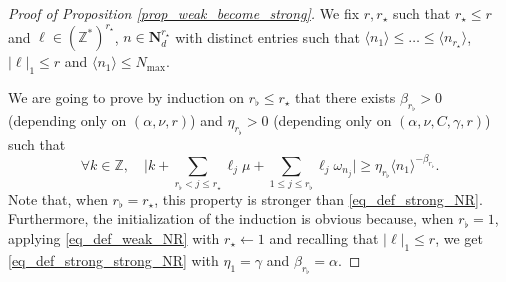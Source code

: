 \begin{proof}[Proof of Proposition \ref{prop_weak_become_strong}] We fix $r,r_\star$ such that $r_\star \leq r$ and $\ell \in (\mathbb{Z}^*)^{r_\star}$, $n \in \mathbf{N}_d^{r_\star}$ with distinct entries such that $\langle n_1 \rangle \leq \dots \leq \langle n_{r_\star} \rangle$, $|\ell|_1 \leq r$ and $\langle n_1 \rangle \leq N_{\max}$.

We are going to prove by induction on $r_{\flat}\leq r_\star$ that there exists $\beta_{r_\flat}>0$ (depending only on $(\alpha,\nu,r)$) and $\eta_{r_\flat} >0$ (depending only on $(\alpha,\nu,C,\gamma,r)$) such that
\begin{equation}
\label{eq_def_strong_strong_NR}
\forall k \in \mathbb{Z}, \quad \biggl| k + \sum_{r_{\flat} <j \leq r_\star} \ell_j \mu + \sum_{1\leq j \leq r_{\flat} }\ell_j \omega_{n_j} \biggr| \geq \eta_{r_\flat} \langle n_{1} \rangle^{-\beta_{r_\flat}}.
\end{equation}
Note that, when $r_{\flat}= r_\star$, this property is stronger than \eqref{eq_def_strong_NR}. Furthermore, the initialization of the induction is obvious because, when $r_{\flat}=1$, applying \eqref{eq_def_weak_NR} with $r_\star \leftarrow 1$ and recalling that $|\ell|_1 \leq r$, we get \eqref{eq_def_strong_strong_NR} with $\eta_{1} = \gamma$ and $\beta_{r_\flat} = \alpha$.


\end{proof}
